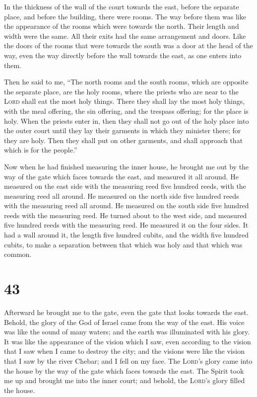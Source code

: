  In the thickness of the wall of the court towards the
east, before the separate place, and before the building, there were
rooms.  The way before them was like the appearance of
the rooms which were towards the north. Their length and width were the
same. All their exits had the same arrangement and doors.
 Like the doors of the rooms that were towards the south
was a door at the head of the way, even the way directly before the wall
towards the east, as one enters into them.

 Then he said to me, ``The north rooms and the south
rooms, which are opposite the separate place, are the holy rooms, where
the priests who are near to the \textsc{Lord} shall eat the most holy
things. There they shall lay the most holy things, with the meal
offering, the sin offering, and the trespass offering; for the place is
holy.  When the priests enter in, then they shall not go
out of the holy place into the outer court until they lay their garments
in which they minister there; for they are holy. Then they shall put on
other garments, and shall approach that which is for the people.''

 Now when he had finished measuring the inner house, he
brought me out by the way of the gate which faces towards the east, and
measured it all around.  He measured on the east side
with the measuring reed five hundred reeds, with the measuring reed all
around.  He measured on the north side five hundred reeds
with the measuring reed all around.  He measured on the
south side five hundred reeds with the measuring reed. 
He turned about to the west side, and measured five hundred reeds with
the measuring reed.  He measured it on the four sides. It
had a wall around it, the length five hundred cubits, and the width five
hundred cubits, to make a separation between that which was holy and
that which was common.

\hypertarget{section-42}{%
\section{43}\label{section-42}}

 Afterward he brought me to the gate, even the gate that
looks towards the east.  Behold, the glory of the God of
Israel came from the way of the east. His voice was like the sound of
many waters; and the earth was illuminated with his glory.
 It was like the appearance of the vision which I saw,
even according to the vision that I saw when I came to destroy the city;
and the visions were like the vision that I saw by the river Chebar; and
I fell on my face.  The \textsc{Lord}'s glory came into
the house by the way of the gate which faces towards the east.
 The Spirit took me up and brought me into the inner
court; and behold, the \textsc{Lord}'s glory filled the house.

